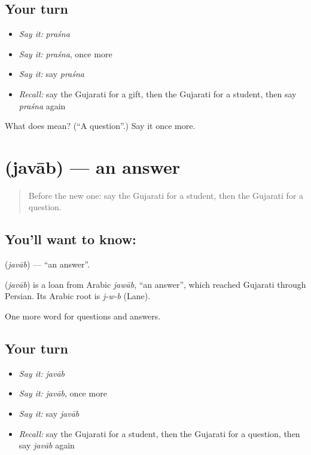 \subsection*{Your turn}
\begin{itemize}
\raggedright
  \item \emph{Say it:} \emph{praśna}
  \item \emph{Say it:} \emph{praśna}, once more
  \item \emph{Say it:} say \emph{praśna}
  \item \emph{Recall:} say the Gujarati for a gift, then the Gujarati for a student, then say \emph{praśna} again
\end{itemize}

\begin{tcolorbox}[breakable,colback=teal!4,colframe=teal!35!black,title={Before you move on}]
What does  mean? (\textquotedblleft{}A question\textquotedblright{}.) Say it once more.
\end{tcolorbox}
\section[\texorpdfstring{\gu{જવાબ} (javāb)}{જવાબ (javāb)}]{ (javāb) — an answer}

\label{lesson:GU-C89-answer}



\begin{quote}
Before the new one: say the Gujarati for a student, then the Gujarati for a question.
\end{quote}

\subsection*{You'll want to know: }
\textbf{} (\emph{javāb}) — \textquotedblleft{}an answer\textquotedblright{}.

\begin{cousinweb}
\textbf{} (\emph{javāb}) is a loan from Arabic \emph{jawāb}, \textquotedblleft{}an answer\textquotedblright{}, which reached Gujarati through Persian. Its Arabic root is \emph{j-w-b} (Lane).
\end{cousinweb}

\begin{grammarlens}[title={What you've built}]
One more word for questions and answers.
\end{grammarlens}

\subsection*{Your turn}
\begin{itemize}
\raggedright
  \item \emph{Say it:} \emph{javāb}
  \item \emph{Say it:} \emph{javāb}, once more
  \item \emph{Say it:} say \emph{javāb}
  \item \emph{Recall:} say the Gujarati for a student, then the Gujarati for a question, then say \emph{javāb} again
\end{itemize}

